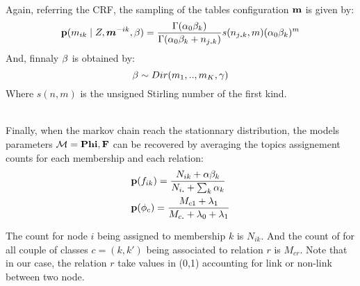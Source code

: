 ~\\
Again, referring the CRF, the sampling of the tables configuration $\mathbf{m}$ is given by: 
\begin{equation}
\mathbf{p}(m_{ik} \mid Z, \bm{m}^{-ik}, \mathbf{\beta} ) = \frac{\Gamma(\alpha_0 \beta_k)}{\Gamma(\alpha_0 \beta_k + n_{j\bm{.   }k})} s(n_{j\bm{.}k}, m) (\alpha_0 \beta_k)^m
\end{equation}
And, finnaly  $\mathbf{\beta}$ is obtained by:
\begin{equation}
\mathbf{\beta} \sim Dir(m_1,.., m_K, \gamma)  
\end{equation}
Where $s(n,m)$ is the unsigned Stirling number of the first kind.


~\\
Finally, when the markov chain reach the stationnary distribution, the models parameters $\mathcal{M} = \mathbf{Phi}, \mathbf{F}$ can be recovered by averaging the topics assignement counts for each membership and each relation:
\begin{align}
&\mathbf{p}(f_{ik}) =\frac{ N_{ik} + \alpha\beta_k}{ N_{i\bm{.}} + \sum_k\alpha_k }\\
&\mathbf{p}(\phi_c ) = \frac{M_{c1} + \lambda_1}{M_{c\bm{.}} + \lambda_0 + \lambda_1}
\end{align}


The count for node $i$ being assigned to membership $k$ is $N_{ik}$. And the count of for all couple of classes $c=(k,k')$ being associated to relation $r$ is $M_{cr}$. Note that in our case, the relation $r$ take values in (0,1) accounting for link or non-link between two node.
